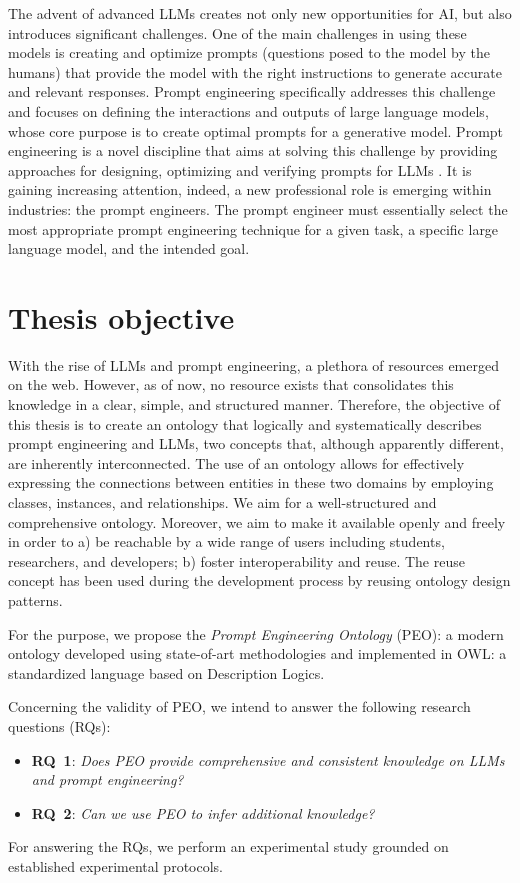 The advent of advanced LLMs creates not only new opportunities for AI, but also introduces significant challenges.
One of the main challenges in using these models is creating and optimize prompts (questions posed to the model by the humans) \cite{ref5} that provide the model with the right instructions to generate accurate and relevant responses. Prompt engineering specifically addresses this challenge and focuses on defining the interactions and outputs of large language models, whose core purpose is to create optimal prompts for a generative model\cite{amatriain2024prompt}.
Prompt engineering is a novel discipline that aims at solving this challenge by providing approaches for designing, optimizing and verifying prompts for LLMs \cite{amatriain2024prompt}.
It is gaining increasing attention, indeed, a new professional role is emerging within industries: the prompt engineers. The prompt engineer must essentially select the most appropriate prompt engineering technique for a given task, a specific large language model, and the intended goal.

\section{Thesis objective}
With the rise of LLMs and prompt engineering, a plethora of resources emerged on the web.
However, as of now, no resource exists that consolidates this knowledge in a clear, simple, and structured manner.
Therefore, the objective of this thesis is to create 
an ontology that logically and systematically describes prompt engineering and LLMs, two concepts that, although apparently different, are inherently interconnected.
The use of an ontology allows for effectively expressing the connections between entities in these two domains by employing classes, instances, and relationships.
We aim for a well-structured and comprehensive ontology.
Moreover, we aim to make it available openly and freely in order to a) be reachable by a wide range of users including students, researchers, and developers; b) foster interoperability and reuse. The reuse concept has been used during the development process by reusing ontology design patterns. 

For the purpose, we propose the \textit{Prompt Engineering Ontology} (PEO): a modern ontology developed using state-of-art methodologies and implemented in OWL: a standardized language based on Description Logics.

Concerning the validity of PEO, we intend to answer the following research questions (RQs):
\begin{itemize}
    \item \textbf{RQ~1}: \textit{Does PEO provide comprehensive and consistent knowledge on LLMs and prompt engineering?}

    \item \textbf{RQ~2}: \textit{Can we use PEO to infer additional knowledge?}
\end{itemize}
For answering the RQs, we perform an experimental study grounded on established experimental protocols.


